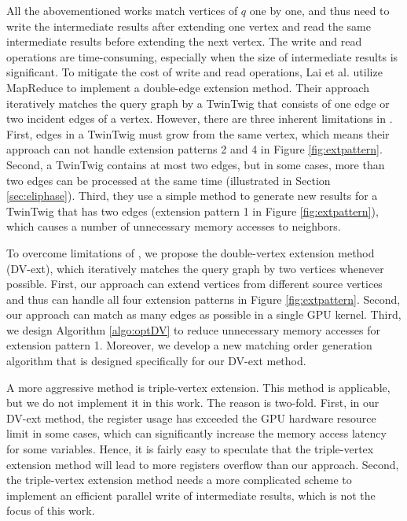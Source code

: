 All the abovementioned works match vertices of $q$ one by one, and thus need to write the intermediate results after extending one vertex and read the same intermediate results before extending the next vertex. The write and read operations are time-consuming, especially when the size of intermediate results is significant. To mitigate the cost of write and read operations, Lai et al. \cite{lai2015scalable} utilize MapReduce to implement a double-edge extension method. Their approach iteratively matches the query graph by a TwinTwig that consists of one edge or two incident edges of a vertex. However, there are three inherent limitations in \cite{lai2015scalable}. First, edges in a TwinTwig must grow from the same vertex, which means their approach can not handle extension patterns 2 and 4 in Figure \ref{fig:extpattern}. Second, a TwinTwig contains at most two edges, but in some cases,  more than two edges can be processed at the same time (illustrated in Section \ref{sec:eliphase}). Third, they use a simple method to generate new results for a TwinTwig that has two edges (extension pattern 1 in Figure \ref{fig:extpattern}), which causes a number of unnecessary memory accesses to neighbors.

To overcome limitations of \cite{lai2015scalable}, we propose the double-vertex extension method (DV-ext), which iteratively matches the query graph by two vertices whenever possible. First, our approach can extend vertices from different source vertices and thus can handle all four extension patterns in Figure \ref{fig:extpattern}. Second, our approach can match as many edges as possible in a single GPU kernel. Third, we design Algorithm \ref{algo:optDV} to reduce unnecessary memory accesses for extension pattern 1. Moreover, we develop a new matching order generation algorithm that is designed specifically for our DV-ext method.

 A more aggressive method is triple-vertex extension. This method is applicable, but we do not implement it in this work. The reason is two-fold. First, in our DV-ext method, the register usage has exceeded the GPU hardware resource limit in some cases, which can significantly increase the memory access latency for some variables. Hence, it is fairly easy to speculate that the triple-vertex extension method will lead to more registers overflow than our approach. Second, the triple-vertex extension method needs a more complicated scheme to implement an efficient parallel write of intermediate results, which is not the focus of this work.

